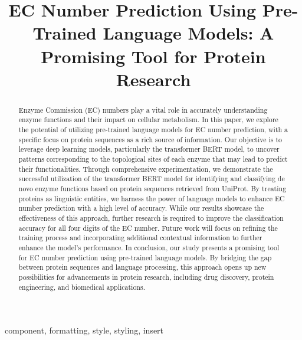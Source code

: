 \documentclass[conference]{IEEEtran}
\begin{document}
\title{EC Number Prediction Using Pre-Trained Language Models: A Promising Tool for Protein Research}

\author{
}

\maketitle

\begin{abstract}
Enzyme Commission (EC) numbers play a vital role in accurately understanding enzyme functions and their impact on cellular metabolism. In this paper, we explore the potential of utilizing pre-trained language models for EC number prediction, with a specific focus on protein sequences as a rich source of information. Our objective is to leverage deep learning models, particularly the transformer BERT model, to uncover patterns corresponding to the topological sites of each enzyme that may lead to predict their functionalities. Through comprehensive experimentation, we demonstrate the successful utilization of the transformer BERT model for identifying and classifying de novo enzyme functions based on protein sequences retrieved from UniProt. By treating proteins as linguistic entities, we harness the power of language models to enhance EC number prediction with a high level of accuracy. While our results showcase the effectiveness of this approach, further research is required to improve the classification accuracy for all four digits of the EC number. Future work will focus on refining the training process and incorporating additional contextual information to further enhance the model's performance.  In conclusion, our study presents a promising tool for EC number prediction using pre-trained language models. By bridging the gap between protein sequences and language processing, this approach opens up new possibilities for advancements in protein research, including drug discovery, protein engineering, and biomedical applications.
\end{abstract}

\begin{IEEEkeywords}
component, formatting, style, styling, insert
\end{IEEEkeywords}
\end{document}
